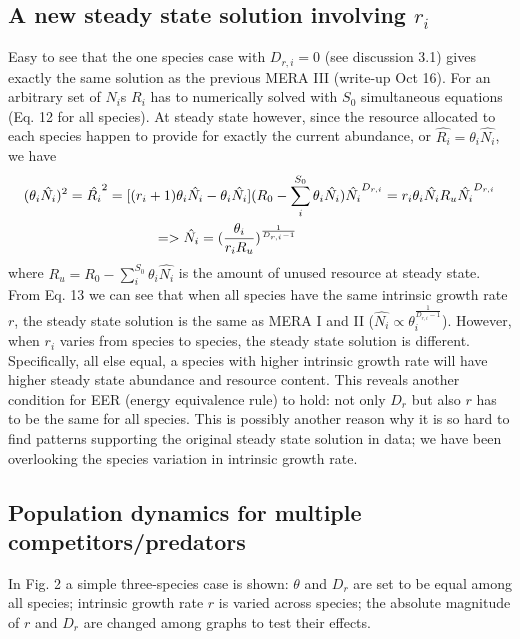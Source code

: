 \documentclass[12pt]{article}
\begin{document}
\subsection{A new steady state solution involving $r_i$}
Easy to see that the one species case with $D_{r,i}=0$ (see discussion 3.1) gives exactly the same solution as the previous MERA III (write-up Oct 16). For an arbitrary set of $N_i$s $R_i$ has to numerically solved with $S_0$ simultaneous equations (Eq. 12 for all species). At steady state however, since the resource allocated to each species happen to provide for exactly the current abundance, or  $\hat{R_i} = \theta_i \hat{N_i}$, we have
  \begin{equation}
   \begin{split}
(\theta_i \hat{N_i})^2 =\hat{R_i}^2=  [(r_i+1)\theta_i \hat{N_i} -\theta_i \hat{N_i}](R_0 -\sum_i^{S_0}\theta_i \hat{N_i}) \hat{N_i} ^{D_{r,i}}
= r_i \theta_i \hat{N_i} R_u \hat{N_i} ^{D_{r,i}} \\
=> \hat{N_i} = (\frac{\theta_i}{r_i R_u})^{\frac{1}{D_{r,i}-1}}\hskip 5cm
\end{split}
\end{equation}
where $R_u = R_0 -\sum_i^{S_0}\theta_i \hat{N_i}$ is the amount of unused resource at steady state. From Eq. 13 we can see that when all species have the same intrinsic growth rate $r$, the steady state solution is the same as MERA I and II ($ \hat{N_i} \propto  \theta_i ^{\frac{1}{D_{r,i}-1}}$). However, when $r_i$ varies from species to species, the steady state solution is different. Specifically, all else equal, a species with higher intrinsic growth rate will have higher steady state abundance and resource content. This reveals another condition for EER (energy equivalence rule) to hold: not only $D_r$ but also $r$ has to be the same for all species. This is possibly another reason why it is so hard to find patterns supporting the original steady state solution in data; we have been overlooking the species variation in intrinsic growth rate.

\subsection{Population dynamics for multiple competitors/predators}
In Fig. 2 a simple three-species case is shown: $\theta$ and $D_r$ are set to be equal among all species; intrinsic growth rate $r$ is varied across species; the absolute magnitude of $r$ and $D_r$ are changed among graphs to test their effects.
\end{document}
